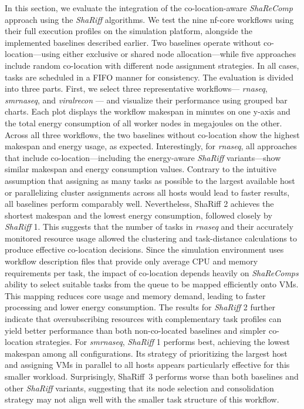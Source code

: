 In this section, we evaluate the integration of the co-location-aware \textit{ShaReComp} approach using the \textit{ShaRiff} algorithms. We test the nine nf-core workflows using their full execution profiles on the simulation platform, alongside the implemented baselines described earlier. Two baselines operate without co-location—using either exclusive or shared node allocation—while five approaches include random co-location with different node assignment strategies. In all cases, tasks are scheduled in a FIFO manner for consistency.
The evaluation is divided into three parts. First, we select three representative workflows— \textit{rnaseq}, \textit{smrnaseq}, and \textit{viralrecon} — and visualize their performance using grouped bar charts. Each plot displays the workflow makespan in minutes on one y-axis and the total energy consumption of all worker nodes in megajoules on the other.
Across all three workflows, the two baselines without co-location show the highest makespan and energy usage, as expected. Interestingly, for \textit{rnaseq}, all approaches that include co-location—including the energy-aware \textit{ShaRiff} variants—show similar makespan and energy consumption values. Contrary to the intuitive assumption that assigning as many tasks as possible to the largest available host or parallelizing cluster assignments across all hosts would lead to faster results, all baselines perform comparably well. Nevertheless, {ShaRiff} 2 achieves the shortest makespan and the lowest energy consumption, followed closely by \textit{ShaRiff} 1. This suggests that the number of tasks in \textit{rnaseq} and their accurately monitored resource usage allowed the clustering and task-distance calculations to produce effective co-location decisions. Since the simulation environment uses workflow description files that provide only average CPU and memory requirements per task, the impact of co-location depends heavily on \textit{ShaReComps} ability to select suitable tasks from the queue to be mapped efficiently onto VMs. This mapping reduces core usage and memory demand, leading to faster processing and lower energy consumption. The results for \textit{ShaRiff} 2 further indicate that oversubscribing resources with complementary task profiles can yield better performance than both non-co-located baselines and simpler co-location strategies.
For \textit{smrnaseq}, \textit{ShaRiff} 1 performs best, achieving the lowest makespan among all configurations. Its strategy of prioritizing the largest host and assigning VMs in parallel to all hosts appears particularly effective for this smaller workload. Surprisingly, ShaRiff~3 performs worse than both baselines and other \textit{ShaRiff} variants, suggesting that its node selection and consolidation strategy may not align well with the smaller task structure of this workflow.
